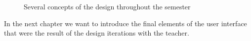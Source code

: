 \begin{figure}[H]
\begin{minipage}{0.32\textwidth}
  \end{minipage}
  \caption{Several concepts of the design throughout the semester}
\end{figure}

In the next chapter we want to introduce the final elements of the user interface that were the result of the design iterations with the teacher.

